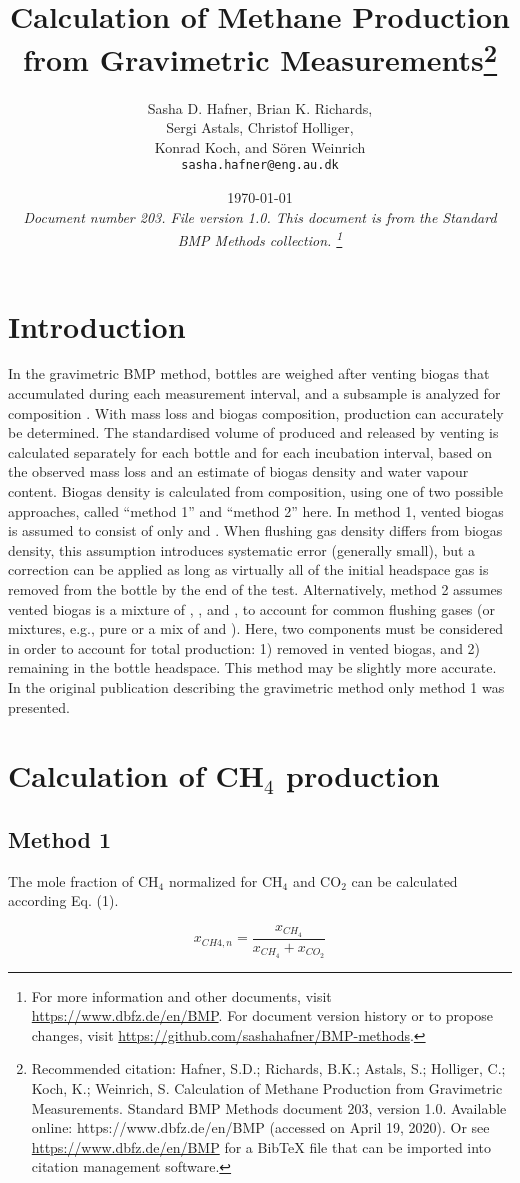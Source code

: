 \documentclass[]{article}
\title {Calculation of Methane Production from Gravimetric Measurements\footnote{
  Recommended citation: 
Hafner, S.D.; Richards, B.K.; Astals, S.; Holliger, C.; Koch, K.; Weinrich, S. Calculation of Methane Production from Gravimetric Measurements. Standard BMP Methods document 203, version 1.0. Available online: https://www.dbfz.de/en/BMP (accessed on April 19, 2020).
  \newline
  Or see \url{https://www.dbfz.de/en/BMP} for a BibTeX file that can be imported into citation management software.
}}
\author{Sasha D. Hafner, Brian K. Richards, \\ Sergi Astals, Christof Holliger, \\ Konrad Koch, and S{\"o}ren Weinrich
\\
\texttt{sasha.hafner@eng.au.dk}
}
\date{\today \\
\bigskip
\textit{
  Document number 203.
  File version 1.0. 
  This document is from the Standard BMP Methods collection.
    \footnote{For more information and other documents, visit \url{https://www.dbfz.de/en/BMP}. 
    For document version history or to propose changes, visit \url{https://github.com/sashahafner/BMP-methods}.}
}
}
\begin{document}
\maketitle

\section{Introduction}
In the gravimetric BMP method, bottles are weighed after venting biogas that accumulated during each measurement interval, and a subsample is analyzed for composition \cite{validation}.
With mass loss and biogas composition,  production can accurately be determined.
The standardised volume of  produced and released by venting is calculated separately for each bottle and for each incubation interval, based on the observed mass loss and an estimate of biogas density and water vapour content. 
Biogas density is calculated from composition, using one of two possible approaches, called ``method 1'' and ``method 2'' here.
In method 1, vented biogas is assumed to consist of only  and . 
When flushing gas density differs from biogas density, this assumption introduces systematic error (generally small), but a correction can be applied as long as virtually all of the initial headspace gas is removed from the bottle by the end of the test. 
Alternatively, method 2 assumes vented biogas is a mixture of , , and , to account for common flushing gases (or mixtures, e.g., pure  or a mix of  and ).
Here, two components must be considered in order to account for total  production: 1)  removed in vented biogas, and 2)  remaining in the bottle headspace.
This method may be slightly more accurate.
In the original publication describing the gravimetric method \cite{validation} only method 1 was presented.

\section{Calculation of CH$_4$ production}

\subsection{Method 1}

The mole fraction of CH$_{4}$ normalized for CH$_{4}$ and CO$_{2}$ can be calculated according Eq. (1). 

\begin{equation}
  \label{eq:xch4n}
    x_{CH{4},n} = \frac{x_{CH_4}}{x_{CH_4} + x_{CO_2}}
\end{equation}
\end{document}
